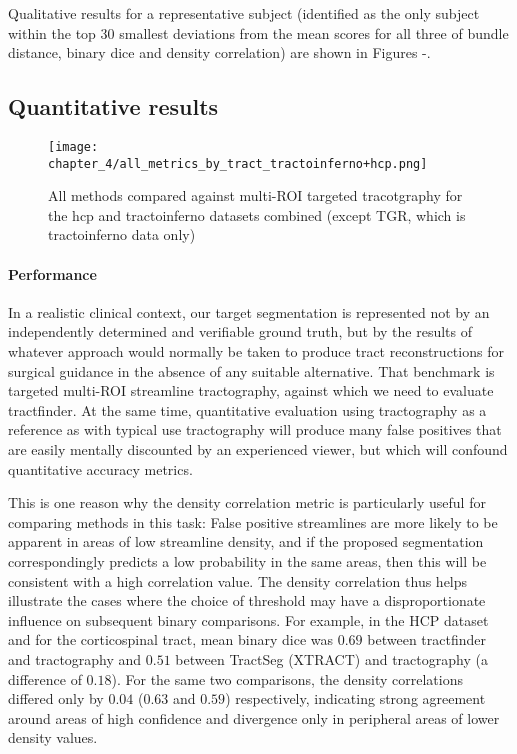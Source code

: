 Qualitative results for a representative subject (identified as the only subject within the top 30 smallest deviations from the mean scores for all three of bundle distance, binary \gls{dice} and density correlation) are shown in Figures -. 

\subsection{Quantitative results}

\begin{figure}[h!]
  \centering
  \texttt{[image: chapter\_4/all\_metrics\_by\_tract\_tractoinferno+hcp.png]}
  \caption{All methods compared against multi-ROI targeted tracotgraphy for the hcp and tractoinferno datasets combined (except TGR, which is tractoinferno data only)}
  \label{fig:combobox}
\end{figure}

\paragraph*{Performance}

In a realistic clinical context, our target segmentation is represented not by an independently determined and verifiable ground truth, but by the results of whatever approach would normally be taken to produce tract reconstructions for surgical guidance in the absence of any suitable alternative.
That benchmark is targeted multi-ROI streamline tractography, against which we need to evaluate tractfinder.
At the same time, quantitative evaluation using tractography as a reference  as with typical use tractography will produce many false positives that are easily mentally discounted by an experienced viewer, but which will confound quantitative accuracy metrics.

This is one reason why the density correlation metric is particularly useful for comparing methods in this task: 
False positive streamlines are more likely to be apparent in areas of low streamline density, and if the proposed segmentation correspondingly predicts a low probability in the same areas, then this will be consistent with a high correlation value.
The density correlation thus helps illustrate the cases where the choice of threshold may have a disproportionate influence on subsequent binary comparisons.
For example, in the HCP dataset and for the corticospinal tract, mean binary \gls{dice} was $0.69$ between tractfinder and tractography and $0.51$ between TractSeg (XTRACT) and tractography (a difference of $0.18$).
For the same two comparisons, the density correlations differed only by $0.04$ ($0.63$ and $0.59$) respectively, indicating strong agreement around areas of high confidence and divergence only in peripheral areas of lower density values.

